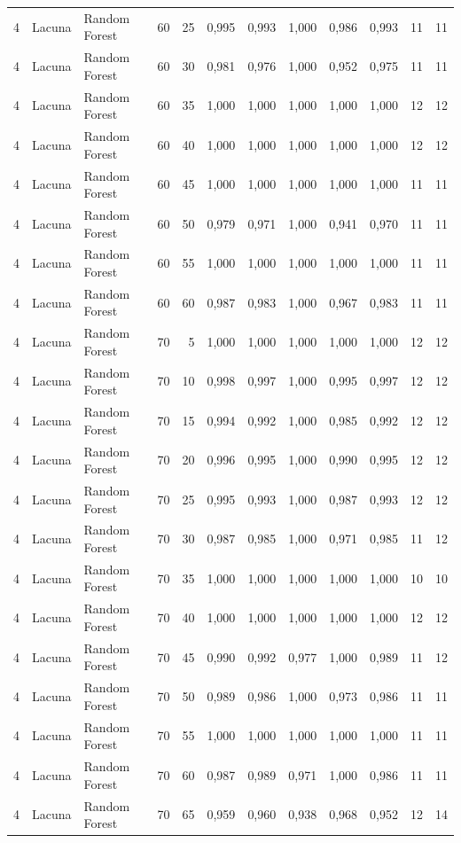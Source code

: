 \begin{longtable}{@{}rllrrrrrrrrr@{}}
4 & Lacuna & Random Forest & 60 & 25 & 0,995 & 0,993 & 1,000 & 0,986 & 0,993 & 11 & 11 \\
4 & Lacuna & Random Forest & 60 & 30 & 0,981 & 0,976 & 1,000 & 0,952 & 0,975 & 11 & 11 \\
4 & Lacuna & Random Forest & 60 & 35 & 1,000 & 1,000 & 1,000 & 1,000 & 1,000 & 12 & 12 \\
4 & Lacuna & Random Forest & 60 & 40 & 1,000 & 1,000 & 1,000 & 1,000 & 1,000 & 12 & 12 \\
4 & Lacuna & Random Forest & 60 & 45 & 1,000 & 1,000 & 1,000 & 1,000 & 1,000 & 11 & 11 \\
4 & Lacuna & Random Forest & 60 & 50 & 0,979 & 0,971 & 1,000 & 0,941 & 0,970 & 11 & 11 \\
4 & Lacuna & Random Forest & 60 & 55 & 1,000 & 1,000 & 1,000 & 1,000 & 1,000 & 11 & 11 \\
4 & Lacuna & Random Forest & 60 & 60 & 0,987 & 0,983 & 1,000 & 0,967 & 0,983 & 11 & 11 \\
4 & Lacuna & Random Forest & 70 & 5 & 1,000 & 1,000 & 1,000 & 1,000 & 1,000 & 12 & 12 \\
4 & Lacuna & Random Forest & 70 & 10 & 0,998 & 0,997 & 1,000 & 0,995 & 0,997 & 12 & 12 \\
4 & Lacuna & Random Forest & 70 & 15 & 0,994 & 0,992 & 1,000 & 0,985 & 0,992 & 12 & 12 \\
4 & Lacuna & Random Forest & 70 & 20 & 0,996 & 0,995 & 1,000 & 0,990 & 0,995 & 12 & 12 \\
4 & Lacuna & Random Forest & 70 & 25 & 0,995 & 0,993 & 1,000 & 0,987 & 0,993 & 12 & 12 \\
4 & Lacuna & Random Forest & 70 & 30 & 0,987 & 0,985 & 1,000 & 0,971 & 0,985 & 11 & 12 \\
4 & Lacuna & Random Forest & 70 & 35 & 1,000 & 1,000 & 1,000 & 1,000 & 1,000 & 10 & 10 \\
4 & Lacuna & Random Forest & 70 & 40 & 1,000 & 1,000 & 1,000 & 1,000 & 1,000 & 12 & 12 \\
4 & Lacuna & Random Forest & 70 & 45 & 0,990 & 0,992 & 0,977 & 1,000 & 0,989 & 11 & 12 \\
4 & Lacuna & Random Forest & 70 & 50 & 0,989 & 0,986 & 1,000 & 0,973 & 0,986 & 11 & 11 \\
4 & Lacuna & Random Forest & 70 & 55 & 1,000 & 1,000 & 1,000 & 1,000 & 1,000 & 11 & 11 \\
4 & Lacuna & Random Forest & 70 & 60 & 0,987 & 0,989 & 0,971 & 1,000 & 0,986 & 11 & 11 \\
4 & Lacuna & Random Forest & 70 & 65 & 0,959 & 0,960 & 0,938 & 0,968 & 0,952 & 12 & 14 \\

\end{longtable}
